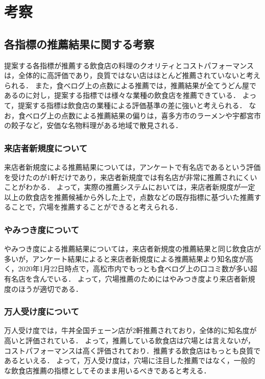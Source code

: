 \chapter{考察}

\label{chap:discussion}

\section{各指標の推薦結果に関する考察}
提案する各指標が推薦する飲食店の料理のクオリティとコストパフォーマンスは，全体的に高評価であり，良質ではない店はほとんど推薦されていないと考えられる．
また，食べログ上の点数による推薦では，推薦結果が全てうどん屋であるのに対し，提案する指標では様々な業種の飲食店を推薦できている．
よって，提案する指標は飲食店の業種による評価基準の差に強いと考えられる．
なお，食べログ上の点数による推薦結果の偏りは，喜多方市のラーメンや宇都宮市の餃子など，安価な名物料理がある地域で散見される．
\par
\subsection{来店者新規度について}
来店者新規度による推薦結果については，アンケートで有名店であるという評価を受けたのが1軒だけであり，来店者新規度では有名店が非常に推薦されにくいことがわかる．
よって，実際の推薦システムにおいては，来店者新規度が一定以上の飲食店を推薦候補から外した上で，点数などの既存指標に基づいた推薦することで，穴場を推薦することができると考えられる．\par

\subsection{やみつき度について}
やみつき度による推薦結果については，来店者新規度の推薦結果と同じ飲食店が多いが，アンケート結果によると来店者新規度による推薦結果より知名度が高く，2020年1月22日時点で，高松市内でもっとも食べログ上の口コミ数が多い超有名店を含んでいる．
よって，穴場推薦のためにはやみつき度より来店者新規度のほうが適切である．\par

\subsection{万人受け度について}
万人受け度では，牛丼全国チェーン店が2軒推薦されており，全体的に知名度が高いと評価されている．
よって，推薦している飲食店は穴場とは言えないが，コストパフォーマンスは高く評価されており．推薦する飲食店はもっとも良質であるといえる．
よって，万人受け度は，穴場に注目した推薦ではなく，一般的な飲食店推薦の指標としてそのまま用いるべきであると考える．

